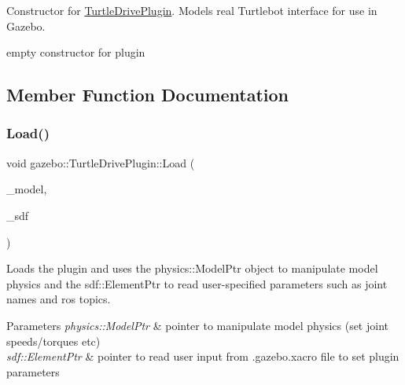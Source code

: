 Constructor for \hyperlink{classgazebo_1_1TurtleDrivePlugin}{Turtle\+Drive\+Plugin}. Models real Turtlebot interface for use in Gazebo. 

empty constructor for plugin 

\subsection{Member Function Documentation}
\mbox{\label{classgazebo_1_1TurtleDrivePlugin_a41993122444281e45f38a5e5171be76a}} 
\subsubsection{\texorpdfstring{Load()}{Load()}}
{\footnotesize\ttfamily void gazebo\+::\+Turtle\+Drive\+Plugin\+::\+Load (\begin{DoxyParamCaption}\item[{physics\+::\+Model\+Ptr}]{\+\_\+model,  }\item[{sdf\+::\+Element\+Ptr}]{\+\_\+sdf }\end{DoxyParamCaption})\hspace{0.3cm}{\ttfamily [virtual]}}



Loads the plugin and uses the physics\+::\+Model\+Ptr object to manipulate model physics and the sdf\+::\+Element\+Ptr to read user-\/specified parameters such as joint names and ros topics. 


\begin{DoxyParams}{Parameters}
{\em physics\+::\+Model\+Ptr} & pointer to manipulate model physics (set joint speeds/torques etc) \\
\hline
{\em sdf\+::\+Element\+Ptr} & pointer to read user input from .gazebo.\+xacro file to set plugin parameters \\
\hline
\end{DoxyParams}
\mbox{\label{classgazebo_1_1TurtleDrivePlugin_ab80df6990ee5bc40d968834ba97c7bb2}} 
